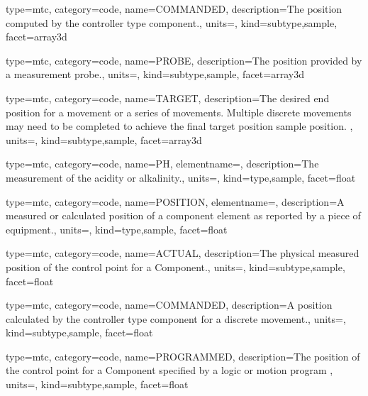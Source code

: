 {
  type=mtc,
  category=code,
  name={COMMANDED},
  description={The position computed by the \gls{controller} type component.},
  units=,
  kind={subtype,sample},
  facet={\gls{array3d}}
}


{
  type=mtc,
  category=code,
  name={PROBE},
  description={The position provided by a measurement probe.},
  units=,
  kind={subtype,sample},
  facet={\gls{array3d}}
}


{
  type=mtc,
  category=code,
  name={TARGET},
  description={The desired end position for a movement or a series of movements. Multiple discrete movements may need to be completed to achieve the final \gls{target position sample} position.  },
  units=,
  kind={subtype,sample},
  facet={\gls{array3d}}
}


{
  type=mtc,
  category=code,
  name={PH},
  elementname=,
  description={The measurement of the acidity or alkalinity.},
  units=,
  kind={type,sample},
  facet={\gls{float}}
}


{
  type=mtc,
  category=code,
  name={POSITION},
  elementname=,
  description={A measured or calculated position of a \gls{component} element as reported by a piece of equipment.},
  units=,
  kind={type,sample},
  facet={\gls{float}}
}


{
  type=mtc,
  category=code,
  name={ACTUAL},
  description={The physical measured position of the control point for a Component.},
  units=,
  kind={subtype,sample},
  facet={\gls{float}}
}


{
  type=mtc,
  category=code,
  name={COMMANDED},
  description={A position calculated by the \gls{controller} type component for a discrete movement.},
  units=,
  kind={subtype,sample},
  facet={\gls{float}}
}


{
  type=mtc,
  category=code,
  name={PROGRAMMED},
  description={The position of the control point for a Component specified by a logic or motion program },
  units=,
  kind={subtype,sample},
  facet={\gls{float}}
}


